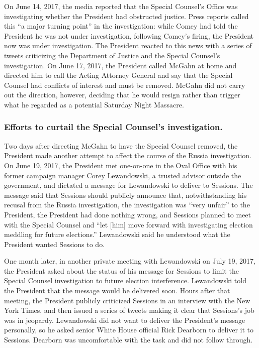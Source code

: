 On June 14, 2017, the media reported that the Special Counsel’s Office was investigating whether the President had obstructed justice.
Press reports called this “a major turning point” in the investigation: while Comey had told the President he was not under investigation, following Comey’s firing, the President now was under investigation.
The President reacted to this news with a series of tweets criticizing the Department of Justice and the Special Counsel’s investigation.
On June 17, 2017, the President called McGahn at home and directed him to call the Acting Attorney General and say that the Special Counsel had conflicts of interest and must be removed.
McGahn did not carry out the direction, however, deciding that he would resign rather than trigger what he regarded as a potential Saturday Night Massacre.

\subsubsection*{Efforts to curtail the Special Counsel’s investigation.}

Two days after directing McGahn to have the Special Counsel removed, the President made another attempt to affect the course of the Russia investigation.
On June 19, 2017, the President met one-on-one in the Oval Office with his former campaign manager Corey Lewandowski, a trusted advisor outside the government, and dictated a message for Lewandowski to deliver to Sessions.
The message said that Sessions should publicly announce that, notwithstanding his recusal from the Russia investigation, the investigation was “very unfair” to the President, the President had done nothing wrong, and Sessions planned to meet with the Special Counsel and “let [him] move forward with investigating election meddling for future elections.”
Lewandowski said he understood what the President wanted Sessions to do.

One month later, in another private meeting with Lewandowski on July 19, 2017, the President asked about the status of his message for Sessions to limit the Special Counsel investigation to future election interference.
Lewandowski told the President that the message would be delivered soon.
Hours after that meeting, the President publicly criticized Sessions in an interview with the New York Times, and then issued a series of tweets making it clear that Sessions’s job was in jeopardy.
Lewandowski did not want to deliver the President’s message personally, so he asked senior White House official Rick Dearborn to deliver it to Sessions.
Dearborn was uncomfortable with the task and did not follow through.

